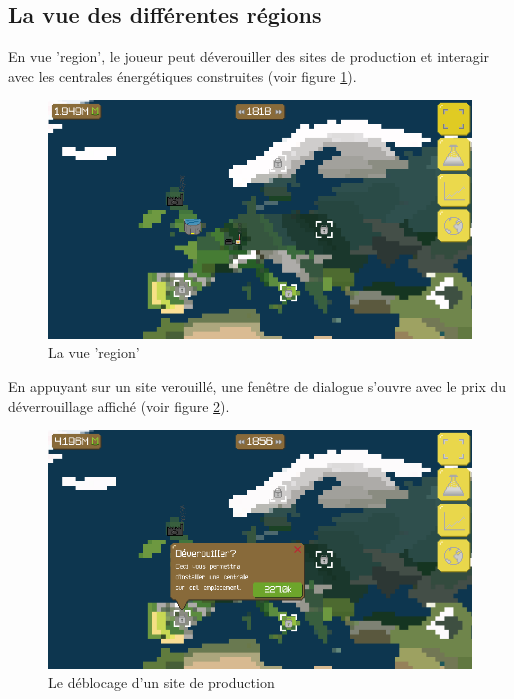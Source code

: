 \documentclass{article}
\begin{document}
		\subsection{La vue des différentes régions} \label{regionView}
		En vue 'region', le joueur peut déverouiller des sites de production et interagir avec les centrales énergétiques construites (voir figure \ref{fig:region}).
		\begin{figure}[H]
                \includegraphics[width=\linewidth]{../images/region}
                \caption{La vue 'region'}
                \label{fig:region}
        \end{figure}
        
        En appuyant sur un site verouillé, une fenêtre de dialogue s'ouvre avec le prix du déverrouillage affiché (voir figure \ref{fig:unlockSite}).
        \begin{figure}[H]
                \includegraphics[width=\linewidth]{../images/unlockSite}
                \caption{Le déblocage d'un site de production}
                \label{fig:unlockSite}
        \end{figure}
        
\end{document}
